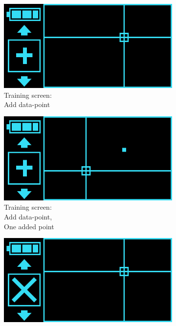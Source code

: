\begin{figure}[H]
    \centering
    \begin{subfigure}[b]{0.19\textwidth}
        \includegraphics[width=\linewidth]{overleaf/images/train.png}
        \caption{Training screen:\\Add data-point\\\quad}
    \end{subfigure}
    \begin{subfigure}[b]{0.19\textwidth}
        \includegraphics[width=\linewidth]{overleaf/images/add.png}
        \caption{Training screen:\\Add data-point,\\One added point}
    \end{subfigure}
    \begin{subfigure}[b]{0.19\textwidth}
        \includegraphics[width=\linewidth]{overleaf/images/remove.png}

\end{subfigure}
\end{figure}
